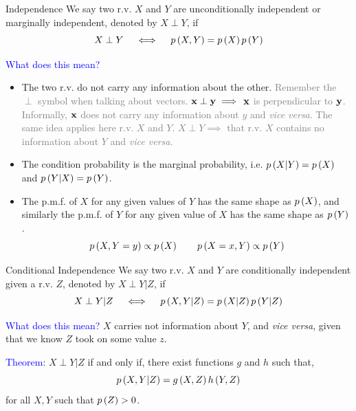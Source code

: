 \documentclass[aspectratio=169]{beamer}
\let\olditem\item
\renewcommand{\item}{\setlength{\itemsep}{\fill}\olditem}
\def\mf{\ensuremath\mathbf}
\def\lp{\ensuremath\left(}
\def\rp{\ensuremath\right)}
\newcommand{\ct}[1]{\lp #1\rp}
\begin{document}
\begin{frame}{Independence}
  We say two r.v. $X$ and $Y$ are unconditionally independent or marginally independent, denoted by $X \perp Y$, if
  \[ X \perp Y \quad \iff \quad p\ct{X, Y} = p\ct{X}p\ct{Y} \]
    
  \textcolor{blue}{What does this mean?}
  \begin{itemize}
    \item The two r.v. do not carry any information about the other. \textcolor{gray}{Remember the $\perp$ symbol when talking about vectors. $\mf{x} \perp \mf{y} \implies$ $\mf{x}$ is perpendicular to $\mf{y}$. Informally, $\mf{x}$ does not carry any information about $y$ and \textit{vice versa}. The same idea applies here r.v. $X$ and $Y$. $X \perp Y \implies$ that r.v. $X$ contains no information about $Y$ and \textit{vice versa}.}
    \item The condition probability is the marginal probability, i.e. $p\ct{X \vert Y} = p\ct{X}$ and $p\ct{Y \vert X} = p\ct{Y}$.
    \item The p.m.f. of $X$ for any given values of $Y$ has the same shape as $p\ct{X}$, and similarly the p.m.f. of $Y$ for any given value of $X$ has the same shape as $p\ct{Y}$.
    \[ p\ct{X, Y=y} \propto p\ct{X} \quad \quad p\ct{X=x, Y} \propto p\ct{Y} \]
  \end{itemize}
\end{frame}


\begin{frame}{Conditional Independence}
  We say two r.v. $X$ and $Y$ are conditionally independent given a r.v. $Z$, denoted by $X \perp Y \vert Z$, if
  \[ X \perp Y \vert Z \quad \iff \quad p\ct{X, Y \vert Z} = p\ct{X \vert Z}p\ct{Y \vert Z} \]
    
  \textcolor{blue}{What does this mean?} $X$ carries not information about $Y$, and \textit{vice versa}, given that we know $Z$ took on some value $z$.
  \vspace{0.2cm}

  \textcolor{blue}{Theorem}:
  $X \perp Y \vert Z$ if and only if, there exist  functions $g$ and $h$ such that,
  \[ p\ct{X, Y \vert Z} = g\ct{X, Z} h\ct{Y, Z} \]
  for all $X, Y$ such that $p\ct{Z} > 0$.
\end{frame}
\end{document}

